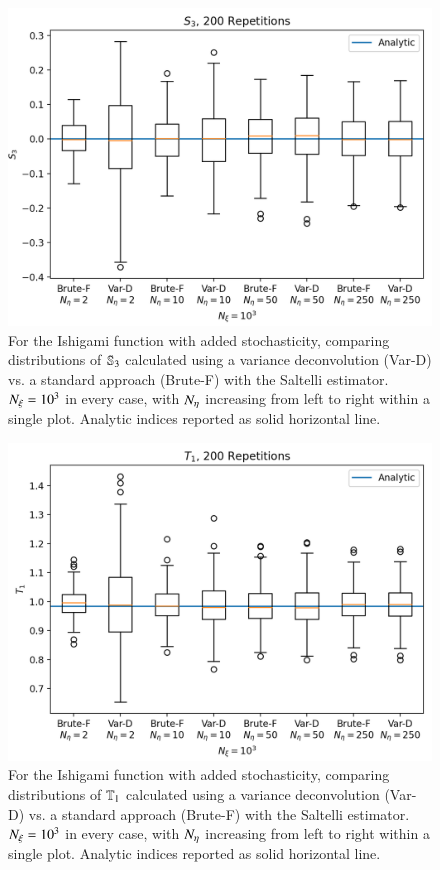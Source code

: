 \begin{figure}[b]
    \centering
    \includegraphics[width=\textwidth]{figures/ishi_s3_boxplot_c5.png}
    \caption{For the Ishigami function with added stochasticity, comparing distributions of $\S{3}$ calculated using a variance deconvolution (Var-D) vs. a standard approach (Brute-F) with the Saltelli estimator. $\Nxi=10^3$ in every case, with $\Neta$ increasing from left to right within a single plot. Analytic indices reported as solid horizontal line.}
    \label{fig:ishigami-s3}
\end{figure}
\begin{figure}[b]
    \centering
    \includegraphics[width=\textwidth]{figures/ishi_t1_boxplot_c5.png}
    \caption{For the Ishigami function with added stochasticity, comparing distributions of $\T{1}$ calculated using a variance deconvolution (Var-D) vs. a standard approach (Brute-F) with the Saltelli estimator. $\Nxi=10^3$ in every case, with $\Neta$ increasing from left to right within a single plot. Analytic indices reported as solid horizontal line.}
    \label{fig:ishigami-t1}
\end{figure}
